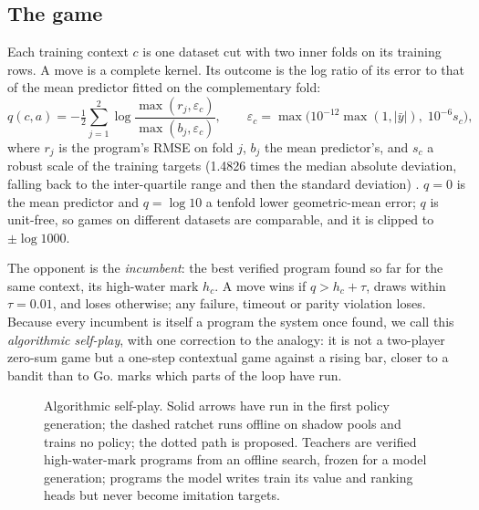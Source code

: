\subsection{The game}

Each training context $c$ is one dataset cut with two inner folds on its training rows. A move is a
complete kernel. Its outcome is the log ratio of its error to that of the mean predictor fitted on
the complementary fold:
\begin{equation}
q(c,a) = -\tfrac12 \sum_{j=1}^{2} \log \frac{\max(r_j,\varepsilon_c)}{\max(b_j,\varepsilon_c)},
\qquad \varepsilon_c = \max\bigl(10^{-12}\max(1,|\bar y|),\; 10^{-6} s_c\bigr),
\label{eq:q}
\end{equation}
where $r_j$ is the program's RMSE on fold $j$, $b_j$ the mean predictor's, and $s_c$ a robust scale
of the training targets (1.4826 times the median absolute deviation, falling back to the
inter-quartile range and then the standard deviation) \citep{jopedime2026writeup}. $q=0$ is the
mean predictor and $q=\log 10$ a tenfold lower geometric-mean error; $q$ is unit-free, so games on
different datasets are comparable, and it is clipped to $\pm\log 1000$.

The opponent is the \emph{incumbent}: the best verified program found so far for the same context,
its high-water mark $h_c$. A move wins if $q > h_c+\tau$, draws within $\tau=0.01$, and loses
otherwise; any failure, timeout or parity violation loses. Because every incumbent is itself a
program the system once found, we call this \emph{algorithmic self-play}, with one correction to
the analogy: it is not a two-player zero-sum game but a one-step contextual game against a rising
bar, closer to a bandit than to Go.  marks which parts of the loop have run.

\begin{figure}[t]
\centering

\caption{Algorithmic self-play. Solid arrows have run in the first policy generation; the dashed
ratchet runs offline on shadow pools and trains no policy; the dotted path is proposed. Teachers
are verified high-water-mark programs from an offline search, frozen for a model generation;
programs the model writes train its value and ranking heads but never become imitation targets.}
\label{fig:game}
\end{figure}

